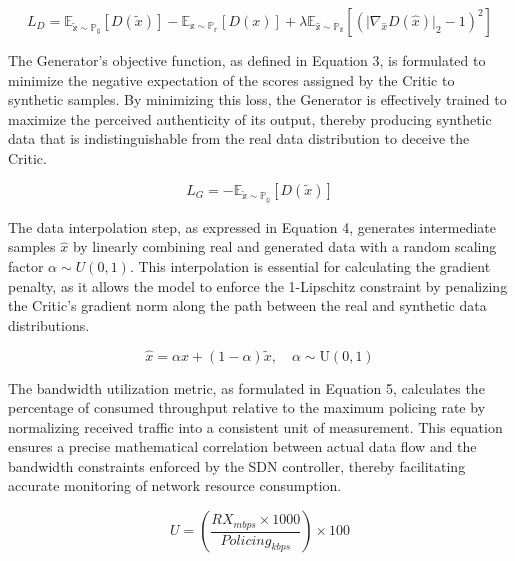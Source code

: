 \documentclass[conference]{IEEEtran}
\begin{document}
\begin{equation}\label{eq:2}
L_{D} = \mathbb{E}_{\widetilde{\mathbb{x}} \sim \mathbb{P}_{\mathbb{g}}}\left\lbrack D\left( \widetilde{x} \right) \right\rbrack - \mathbb{E}_{\mathbb{x} \sim \mathbb{P}_{\mathbb{r}}}\left\lbrack D(x) \right\rbrack + \lambda\mathbb{E}_{\widehat{\mathbb{x}} \sim \mathbb{P}_{\widehat{\mathbb{x}}}}\left\lbrack \left( \text{|}\nabla_{\widehat{x}}D\left( \widehat{x} \right)\text{|}_{2} - 1 \right)^{2} \right\rbrack
\end{equation}

The Generator's objective function, as defined in Equation 3, is formulated to minimize the negative expectation of the scores assigned by the Critic to synthetic samples. By minimizing this loss, the Generator is effectively trained to maximize the perceived authenticity of its output, thereby producing synthetic data that is indistinguishable from the real data distribution to deceive the Critic.

\begin{equation}\label{eq:3}
L_{G} = - \mathbb{E}_{\widetilde{\mathbb{x}} \sim \mathbb{P}_{\mathbb{g}}}\left\lbrack D\left( \widetilde{x} \right) \right\rbrack
\end{equation}

The data interpolation step, as expressed in Equation 4, generates intermediate samples \(\widehat{x}\) by linearly combining real and generated data with a random scaling factor \(\alpha \sim U(0,1)\). This interpolation is essential for calculating the gradient penalty, as it allows the model to enforce the 1-Lipschitz constraint by penalizing the Critic's gradient norm along the path between the real and synthetic data distributions.

\begin{equation}\label{eq:4}
\widehat{x} = \alpha x + (1 - \alpha)\widetilde{x},\quad\alpha \sim \text{U}(0,1)
\end{equation}

The bandwidth utilization metric, as formulated in Equation 5, calculates the percentage of consumed throughput relative to the maximum policing rate by normalizing received traffic into a consistent unit of measurement. This equation ensures a precise mathematical correlation between actual data flow and the bandwidth constraints enforced by the SDN controller, thereby facilitating accurate monitoring of network resource consumption.

\begin{equation}\label{eq:5}
U = \left( \frac{RX_{mbps} \times 1000}{Policing_{kbps}} \right) \times 100
\end{equation}
\end{document}
